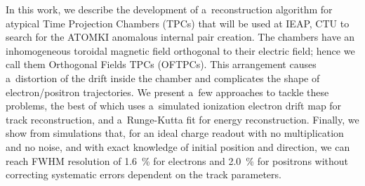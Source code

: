 \documentclass[12pt]{report}
\begin{document}
In this work, we describe the development of a~reconstruction algorithm for atypical Time Projection Chambers (TPCs) that will be used at IEAP, CTU to search for the ATOMKI anomalous internal pair creation. The chambers have an inhomogeneous toroidal magnetic field orthogonal to their electric field; hence we call them Orthogonal Fields TPCs (OFTPCs). This arrangement causes a~distortion of the drift inside the chamber and complicates the shape of electron/positron trajectories. We present a~few approaches to tackle these problems, the best of which uses a~simulated ionization electron drift map for track reconstruction, and a~Runge-Kutta fit for energy reconstruction. Finally, we show from simulations that, for an ideal charge readout with no multiplication and no noise, and with exact knowledge of initial position and direction, we can reach FWHM resolution of \qty{1.6}{\percent} for electrons and \qty{2.0}{\percent} for positrons without correcting systematic errors dependent on the track parameters.
\end{document}
